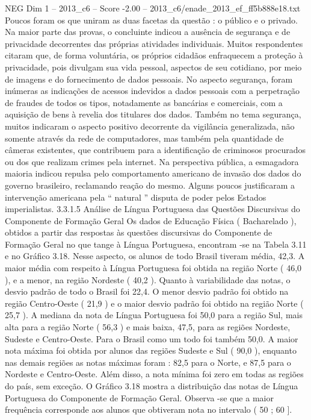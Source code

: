 \begin{textsample}{NEG Dim 1 – 2013\_c6 – Score -2.00 – 2013\_c6/enade\_2013\_ef\_ff5b888e18.txt}
Poucos foram os que uniram as duas facetas da questão : o público e o privado.
Na maior parte das provas, o concluinte indicou a ausência de segurança e de privacidade decorrentes das próprias atividades individuais.
Muitos respondentes citaram que, de forma voluntária, os próprios cidadãos enfraquecem a proteção à privacidade, pois divulgam sua vida pessoal, aspectos de seu cotidiano, por meio de imagens e do fornecimento de dados pessoais.
No aspecto segurança, foram inúmeras as indicações de acessos indevidos a dados pessoais com a perpetração de fraudes de todos os tipos, notadamente as bancárias e comerciais, com a aquisição de bens à revelia dos titulares dos dados.
Também no tema segurança, muitos indicaram o aspecto positivo decorrente da vigilância generalizada, não somente através da rede de computadores, mas também pela quantidade de câmeras existentes, que contribuem para a identificação de criminosos procurados ou dos que realizam crimes pela internet.
Na perspectiva pública, a esmagadora maioria indicou repulsa pelo comportamento americano de invasão dos dados do governo brasileiro, reclamando reação do mesmo.
Alguns poucos justificaram a intervenção americana pela “ natural ” disputa de poder pelos Estados imperialistas. 3.3.1.5 Análise de Língua Portuguesa das Questões Discursivas do Componente de Formação Geral Os dados de Educação Física ( Bacharelado ), obtidos a partir das respostas às questões discursivas do Componente de Formação Geral no que tange à Língua Portuguesa, encontram -se na Tabela 3.11 e no Gráfico 3.18.
Nesse aspecto, os alunos de todo Brasil tiveram média, 42,3.
A maior média com respeito à Língua Portuguesa foi obtida na região Norte ( 46,0 ), e a menor, na região Nordeste ( 40,2 ).
Quanto à variabilidade das notas, o desvio padrão de todo o Brasil foi 22,4.
O menor desvio padrão foi obtido na região Centro-Oeste ( 21,9 ) e o maior desvio padrão foi obtido na região Norte ( 25,7 ).
A mediana da nota de Língua Portuguesa foi 50,0 para a região Sul, mais alta para a região Norte ( 56,3 ) e mais baixa, 47,5, para as regiões Nordeste, Sudeste e Centro-Oeste.
Para o Brasil como um todo foi também 50,0.
A maior nota máxima foi obtida por alunos das regiões Sudeste e Sul ( 90,0 ), enquanto nas demais regiões as notas máximas foram : 82,5 para o Norte, e 87,5 para o Nordeste e Centro-Oeste.
Além disso, a nota mínima foi zero em todas as regiões do país, sem exceção.
O Gráfico 3.18 mostra a distribuição das notas de Língua Portuguesa do Componente de Formação Geral.
Observa -se que a maior frequência corresponde aos alunos que obtiveram nota no intervalo ( 50 ; 60 ].

\end{textsample}
